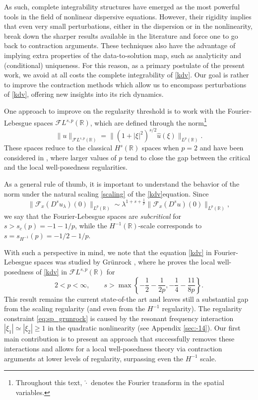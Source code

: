 \documentclass[%
11pt,  reqno]{amsart}
\newcommand{\5}{\textup{V}}
\newcommand{\FL}{\mathcal{F} L}
\newcommand{\ft}{\widehat}
\newcommand{\F}{\mathcal{F}}
\newcommand{\jp}{\color{red}}
\theoremstyle{remark}
\newcommand{\R}{\mathbb{R}}
\numberwithin{equation}{section}
\numberwithin{theorem}{section}
\begin{document}
	
	\medskip

    
	As such, complete integrability structures have emerged as the most powerful tools in the field of nonlinear dispersive equations. However, their rigidity implies that even very small perturbations, either in the dispersion or in the nonlinearity, break down the sharper results available in the literature and force one to go back to contraction arguments. These techniques also have the advantage of implying extra properties of the data-to-solution map, such as analyticity and (conditional) uniqueness.
    For this reason, {\jp as a primary postulate of the present work,} we avoid at all costs the complete integrability of \eqref{kdv}. Our goal is {\jp rather to improve the contraction methods which allow us to encompass perturbations of \eqref{kdv}, offering new insights into its rich dynamics.}

\medskip

One approach to improve on the regularity threshold is to work with the Fourier-Lebesgue spaces $\mathcal{F}L^{s,p}(\R)$, which are defined through the norm\footnote{Throughout this text, $\hat{\cdot}$ denotes the Fourier transform in the spatial variables.}
	\begin{equation}
		\|u\|_{\FL^{s,p}(\R)}=\|(1+|\xi|^2)^{s/2}\ft{u}(\xi)\|_{L^p(\R)}.
	\end{equation} 
These spaces reduce to the classical $H^s(\R)$ spaces when $p=2$ and have been considered in \cite{adams, Chapouto_FL_mkdv, CC24, HerrGrunrock_FL, Grunrock_ldv_hier, GrunrockVega}, where larger values of $p$ tend to close the gap between the critical and the local well-posedness regularities. 

As a general rule of thumb, it is important to understand the behavior of the norm under the natural scaling \eqref{scaling} of the \eqref{kdv}equation.
Since 
$$\|\F_x(D^su_\lambda)(0)\|_{L^p(\R)} \sim \lambda^{1+s+\frac1p}\|\F_x(D^su)(0)\|_{L^p(\R)}, $$ we say that the Fourier-Lebesgue spaces are \emph{subcritical} for $s>s_c(p)=-1-1/p$, while the $H^{-1}(\R)$-scale corresponds to $s=s_{H^{-1}}(p)=-1/2-1/p$.

{\jp With such a perspective in mind, we note that the equation} \eqref{kdv} in Fourier-Lebesgue spaces was studied by Grünrock \cite{Grunrock_ldv_hier},  where he proves the local well-posedness of \eqref{kdv} in $\mathcal{F}L^{s,p}(\R)$ for
	\begin{equation}
		2<p<\infty,\qquad s>\max\left\{ -\frac12 - \frac{1}{2p}, -\frac14 - \frac{11}{8p} \right\}.\label{eq:sp_grunrock}
	\end{equation}
This result remains the current state-of-the art and leaves still a substantial gap from the scaling regularity  (and even from the $H^{-1}$ regularity). The regularity constraint \eqref{eq:sp_grunrock} is caused by the resonant frequency interaction $|\xi_1|\simeq |\xi_2|\ge 1$ in the quadratic nonlinearity (see Appendix \ref{sec:-14}). Our first main contribution is to present an approach that successfully removes these interactions and allows for a local well-posedness theory via contraction arguments at lower levels of regularity, surpassing even the $H^{-1}$ scale.
\end{document}
